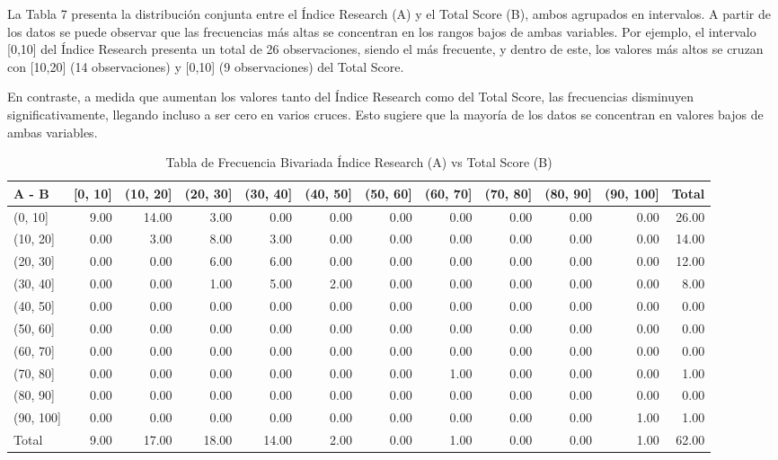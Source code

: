 \documentclass[
]{article}
\begin{document}
\begin{multicols}{2}

La Tabla 7 presenta la distribución conjunta entre el Índice Research (A) y el Total Score (B), ambos agrupados en intervalos. A partir de los datos se puede observar que las frecuencias más altas se concentran en los rangos bajos de ambas variables. Por ejemplo, el intervalo [0,10] del Índice Research presenta un total de 26 observaciones, siendo el más frecuente, y dentro de este, los valores más altos se cruzan con [10,20] (14 observaciones) y [0,10] (9 observaciones) del Total Score.

En contraste, a medida que aumentan los valores tanto del Índice Research como del Total Score, las frecuencias disminuyen significativamente, llegando incluso a ser cero en varios cruces. Esto sugiere que la mayoría de los datos se concentran en valores bajos de ambas variables.

\end{multicols}

\renewcommand{\arraystretch}{1.3}
\begin{scriptsize}%
\begin{longtable}{lrrrrrrrrrrr}
\caption{Tabla de Frecuencia Bivariada Índice Research (A) vs Total Score (B)} \\ 
  \hline
A   -   B & [0, 10] & (10, 20] & (20, 30] & (30, 40] & (40, 50] & (50, 60] & (60, 70] & (70, 80] & (80, 90] & (90, 100] & Total \\ 
  \hline
(0, 10] & 9.00 & 14.00 & 3.00 & 0.00 & 0.00 & 0.00 & 0.00 & 0.00 & 0.00 & 0.00 & 26.00 \\ 
  (10, 20] & 0.00 & 3.00 & 8.00 & 3.00 & 0.00 & 0.00 & 0.00 & 0.00 & 0.00 & 0.00 & 14.00 \\ 
  (20, 30] & 0.00 & 0.00 & 6.00 & 6.00 & 0.00 & 0.00 & 0.00 & 0.00 & 0.00 & 0.00 & 12.00 \\ 
  (30, 40] & 0.00 & 0.00 & 1.00 & 5.00 & 2.00 & 0.00 & 0.00 & 0.00 & 0.00 & 0.00 & 8.00 \\ 
  (40, 50] & 0.00 & 0.00 & 0.00 & 0.00 & 0.00 & 0.00 & 0.00 & 0.00 & 0.00 & 0.00 & 0.00 \\ 
  (50, 60] & 0.00 & 0.00 & 0.00 & 0.00 & 0.00 & 0.00 & 0.00 & 0.00 & 0.00 & 0.00 & 0.00 \\ 
  (60, 70] & 0.00 & 0.00 & 0.00 & 0.00 & 0.00 & 0.00 & 0.00 & 0.00 & 0.00 & 0.00 & 0.00 \\ 
  (70, 80] & 0.00 & 0.00 & 0.00 & 0.00 & 0.00 & 0.00 & 1.00 & 0.00 & 0.00 & 0.00 & 1.00 \\ 
  (80, 90] & 0.00 & 0.00 & 0.00 & 0.00 & 0.00 & 0.00 & 0.00 & 0.00 & 0.00 & 0.00 & 0.00 \\ 
  (90, 100] & 0.00 & 0.00 & 0.00 & 0.00 & 0.00 & 0.00 & 0.00 & 0.00 & 0.00 & 1.00 & 1.00 \\ 
  Total & 9.00 & 17.00 & 18.00 & 14.00 & 2.00 & 0.00 & 1.00 & 0.00 & 0.00 & 1.00 & 62.00 \\ 
   \hline
\hline
\end{longtable}
\end{scriptsize}\renewcommand{\arraystretch}{1}
\end{document}
